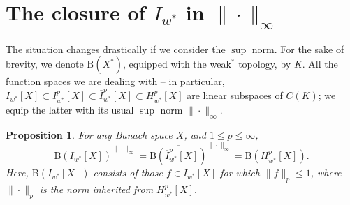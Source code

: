\documentclass{amsart}
\theoremstyle{plain}
\newtheorem{proposition}[theorem]{Proposition}
\theoremstyle{definition}
\numberwithin{equation}{section}
\newcommand{\ball}{\mathrm{B}}
\newcommand{\Hp}{H_{w^*}^{p}}
\newcommand{\nip}{I_{w^*}^{p}}
\newcommand{\Ip}{\overline{I}_{w^*}^{p}}
\begin{document}
\section{The closure of $I_{w^*}$ in $\| \cdot \|_\infty$} \label{sup-norm}
The situation changes drastically if we consider the $\sup$ norm. For the sake of brevity, we denote $\ball(X^*)$, equipped with the weak$^*$ topology, by $K$. 
All the function spaces we are dealing with -- in particular, $I_{w^*}[X] \subset \nip[X] \subset \Ip[X] \subset \Hp[X]$ are linear subspaces of $C(K)$; we equip the latter with its usual $\sup$ norm $\| \cdot \|_\infty$. %

\begin{proposition}\label{denseness}
For any Banach space $X$, and $1 \leq p \leq \infty$, %
$$ \overline{\ball(I_{w^*}[X])}^{\| \cdot \|_\infty} = \overline{\ball(\Ip[X])}^{\| \cdot \|_\infty} = \ball(\Hp[X]) . $$
Here, $\ball(I_{w^*}[X])$ consists of those $f \in I_{w^*}[X]$ for which $\|f\|_p \leq 1$, where $\| \cdot \|_p$ is the norm inherited from $\Hp[X]$.
\end{proposition}
\end{document}
